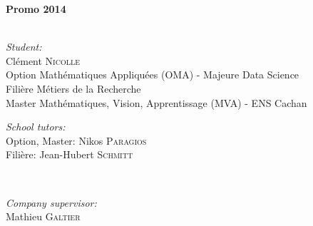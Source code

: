 \documentclass[12pt]{report}
\begin{document}
\begin{titlepage}
\begin{minipage}{0.9\textwidth}
\begin{flushleft} \Large
\bfseries Promo 2014 %
\end{flushleft}
\end{minipage}
\\[1cm]
 
\normalsize \emph{Student:}\\
Clément \textsc{Nicolle} \\
\footnotesize Option Mathématiques Appliquées (OMA) - Majeure Data Science \\
\footnotesize Filière Métiers de la Recherche \\
\footnotesize Master Mathématiques, Vision, Apprentissage (MVA) - ENS Cachan
\\[1cm]

\begin{minipage}{0.5\textwidth}
\begin{flushleft} \normalsize
 \emph{School tutors:}\\
Option, Master: Nikos \textsc{Paragios} \\
Filière: Jean-Hubert \textsc{Schmitt}
\end{flushleft}
\end{minipage}
~
\begin{minipage}{0.4\textwidth}
\begin{flushright} \normalsize
\emph{Company supervisor:} \\
Mathieu \textsc{Galtier} %
\end{flushright}
\end{minipage}\\[2cm]



\vfill %

\end{titlepage}
\end{document}
